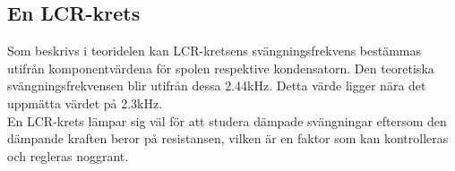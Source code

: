 \documentclass[a4paper,10pt]{article}
\begin{document}
\subsection{En LCR-krets}
Som beskrivs i teoridelen kan LCR-kretsens svängningsfrekvens bestämmas utifrån komponentvärdena för spolen respektive kondensatorn. Den teoretiska svängningsfrekvensen blir utifrån dessa 2.44kHz. Detta värde ligger nära det uppmätta värdet på 2.3kHz.\\
\indent En LCR-krets lämpar sig väl för att studera dämpade svängningar eftersom den dämpande kraften beror på resistansen, vilken är en faktor som kan kontrolleras och regleras noggrant.
\end{document}
